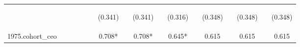 \begin{center}
\begin{tabular}{lcccccccccccccccc}
\vspace{4pt} & \begin{footnotesize}\end{footnotesize} & \begin{footnotesize}\end{footnotesize} & \begin{footnotesize}\end{footnotesize} & \begin{footnotesize}\end{footnotesize} & \begin{footnotesize}\end{footnotesize} & \begin{footnotesize}(0.341)\end{footnotesize} & \begin{footnotesize}\end{footnotesize} & \begin{footnotesize}(0.341)\end{footnotesize} & \begin{footnotesize}\end{footnotesize} & \begin{footnotesize}(0.316)\end{footnotesize} & \begin{footnotesize}\end{footnotesize} & \begin{footnotesize}(0.348)\end{footnotesize} & \begin{footnotesize}\end{footnotesize} & \begin{footnotesize}(0.348)\end{footnotesize} & \begin{footnotesize}\end{footnotesize} & \begin{footnotesize}(0.348)\end{footnotesize} \\
1975.cohort\_ceo &  &  &  &  &  & 0.708* &  & 0.708* &  & 0.645* &  & 0.615 &  & 0.615 &  & 0.615 \\

\end{tabular}
\end{center}
